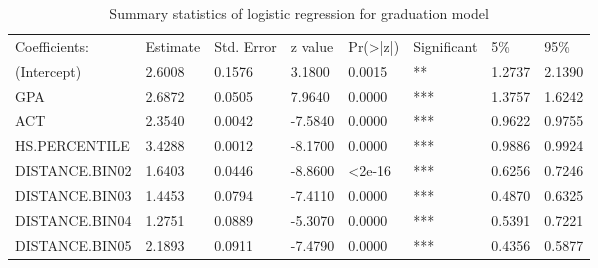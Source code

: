 \documentclass[12pt,english]{report}
\begin{document}
\begin{table}[H]
\centering
\caption{Summary statistics of logistic regression for graduation model}
\label{lr_summary2}
\begin{adjustbox}{width=0.95\textwidth}
\begin{tabular}{|llllllll|} \hline \hline
Coefficients:                   & Estimate & Std. Error & z value & Pr(\textgreater|z|) & Significant & 5\%    & 95\%   \\
(Intercept)                     & 2.6008   & 0.1576     & 3.1800  & 0.0015      & **          & 1.2737 & 2.1390 \\
GPA                             & 2.6872   & 0.0505     & 7.9640  & 0.0000      & ***         & 1.3757 & 1.6242 \\
ACT                             & 2.3540   & 0.0042     & -7.5840 & 0.0000      & ***         & 0.9622 & 0.9755 \\
HS.PERCENTILE                   & 3.4288   & 0.0012     & -8.1700 & 0.0000      & ***         & 0.9886 & 0.9924 \\
DISTANCE.BIN02                  & 1.6403   & 0.0446     & -8.8600 & \textless2e-16     & ***         & 0.6256 & 0.7246 \\
DISTANCE.BIN03                  & 1.4453   & 0.0794     & -7.4110 & 0.0000     & ***         & 0.4870 & 0.6325 \\
DISTANCE.BIN04                  & 1.2751   & 0.0889     & -5.3070 & 0.0000     & ***         & 0.5391 & 0.7221 \\
DISTANCE.BIN05                  & 2.1893   & 0.0911     & -7.4790 & 0.0000     & ***         & 0.4356 & 0.5877 \\

\end{tabular}
\end{adjustbox}
\end{table}
\end{document}
